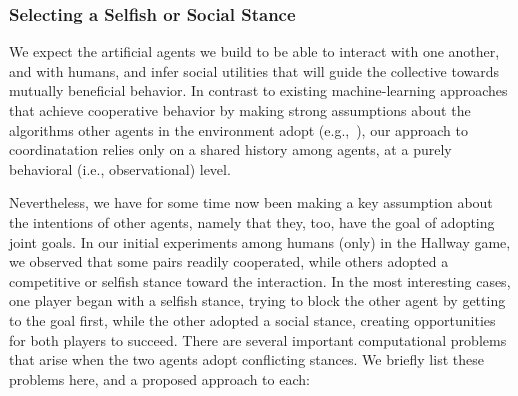 
\subsubsection*{\large Selecting a Selfish or Social Stance}
\label{sec:stance}

We expect the artificial agents we build to be able to interact with
one another, and with humans, and infer social utilities that will
guide the collective towards mutually beneficial behavior.  In
contrast to existing machine-learning approaches that achieve
cooperative behavior by making strong assumptions about the algorithms
other agents in the environment adopt (e.g.,~\cite{conitzer07}), our
approach to coordinatation relies only on a shared history among
agents, at a purely behavioral (i.e., observational) level.

Nevertheless, we have for some time now been making a key assumption
about the intentions of other agents, namely that they, too, have the
goal of adopting joint goals.  In our initial experiments among humans
(only) in the Hallway game, we observed that some pairs readily
cooperated, while others adopted a competitive or selfish stance
toward the interaction.  In the most interesting cases, one player
began with a selfish stance, trying to block the other agent by
getting to the goal first, while the other adopted a social stance,
creating opportunities for both players to succeed.  There are several
important computational problems that arise when the two agents adopt
conflicting stances.  We briefly list these problems here, and a
proposed approach to each:

